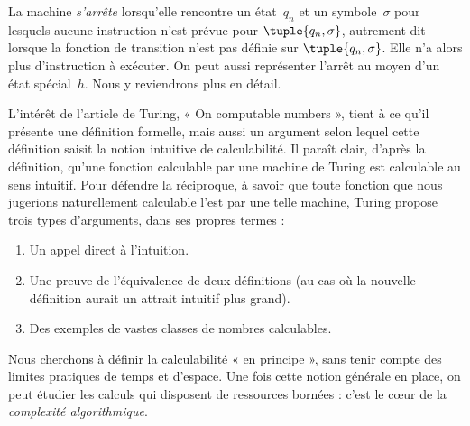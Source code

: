 \documentclass[../../../include/open-logic-section]{subfiles}
\begin{document}
\begin{explain}
La machine \emph{s'arrête} lorsqu'elle rencontre
un état~$q_n$ et un symbole~$\sigma$ pour lesquels
aucune instruction n'est prévue pour
$\tuple{q_n,\sigma}$, autrement dit
lorsque la fonction de transition n'est pas
définie sur $\tuple{q_n,\sigma}$. Elle n'a
alors plus d'instruction à exécuter. On peut
aussi représenter l'arrêt au moyen d'un état
spécial~$h$. Nous y reviendrons plus en détail.
\end{explain}

\begin{digress}
L'intérêt de l'article de Turing, « On computable
numbers », tient à ce qu'il présente une définition
formelle, mais aussi un argument selon lequel
cette définition saisit la notion intuitive de
calculabilité. Il paraît clair, d'après la
définition, qu'une fonction calculable par une
machine de Turing est calculable au sens intuitif.
Pour défendre la réciproque, à savoir que toute
fonction que nous jugerions naturellement calculable
l'est par une telle machine, Turing propose trois
types d'arguments, dans ses propres termes :
\begin{enumerate}
\item Un appel direct à l'intuition.
\item Une preuve de l'équivalence de deux définitions
  (au cas où la nouvelle définition aurait un attrait
  intuitif plus grand).
\item Des exemples de vastes classes de nombres
  calculables.
\end{enumerate}
Nous cherchons à définir la calculabilité « en
principe », sans tenir compte des limites pratiques
de temps et d'espace. Une fois cette notion générale
en place, on peut étudier les calculs qui disposent
de ressources bornées : c'est le cœur de la
\emph{complexité algorithmique}.
\end{digress}
\end{document}
